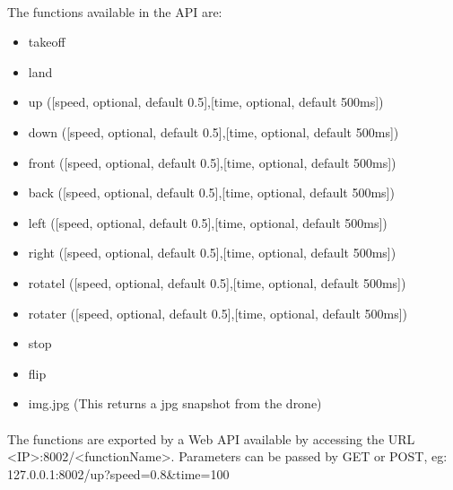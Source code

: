 \documentclass[11pt,twoside,a4paper]{article}
\begin{document}
\paragraph {} The functions available in the API are:
\begin{itemize}
\item takeoff
\item land
\item up ([speed, optional, default 0.5],[time, optional, default 500ms])
\item down ([speed, optional, default 0.5],[time, optional, default 500ms])
\item front ([speed, optional, default 0.5],[time, optional, default 500ms])
\item back ([speed, optional, default 0.5],[time, optional, default 500ms])
\item left ([speed, optional, default 0.5],[time, optional, default 500ms])
\item right ([speed, optional, default 0.5],[time, optional, default 500ms])
\item rotatel ([speed, optional, default 0.5],[time, optional, default 500ms])
\item rotater ([speed, optional, default 0.5],[time, optional, default 500ms])
\item stop
\item flip
\item img.jpg (This returns a jpg snapshot from the drone)
\end{itemize}
\paragraph {} The functions are exported by a Web API available by accessing
the URL <IP>:8002/<functionName>. Parameters can be passed by GET or POST, eg:\\
127.0.0.1:8002/up?speed=0.8\&time=100
\end{document}
